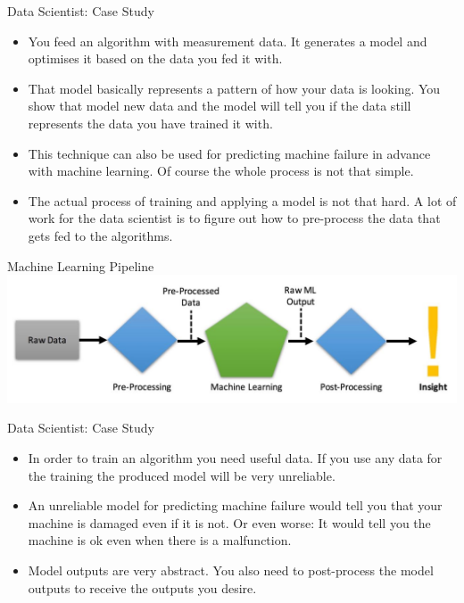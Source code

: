 \documentclass[xcolor=x11names,compress, 24pt]{beamer}
\renewcommand{\(}{\begin{columns}}
\renewcommand{\)}{\end{columns}}
\newcommand{\<}[1]{\begin{column}{#1}}
\renewcommand{\>}{\end{column}}
\begin{document}
\begin{frame}{Data Scientist: Case Study}
	\begin{itemize}
		\item 	You feed an algorithm with measurement data. It generates a model and optimises it based on the data you fed it with. 
		
		\item That model basically represents a pattern of how your data is looking. You show that model new data and the model will tell you if the data still represents the data you have trained it with. 
		
		\item This technique can also be used for predicting machine failure in advance with machine learning. Of course the whole process is not that simple.
		
		\item 	The actual process of training and applying a model is not that hard. A lot of work for the data scientist is to figure out how to pre-process the data that gets fed to the algorithms.
		 
	\end{itemize}
\end{frame}

\begin{frame}{Machine Learning Pipeline}
	\includegraphics[scale=.25]{Machine-Learning-Pipeline}
\end{frame}

\begin{frame}{Data Scientist: Case Study}
	\begin{itemize}
	 
		
		\item 	In order to train an algorithm you need useful data. If you use any data for the training the produced model will be very unreliable.
		
		\item 	An unreliable model for predicting machine failure would tell you that your machine is damaged even if it is not. Or even worse: It would tell you the machine is ok even when there is a malfunction.
		
		\item 	Model outputs are very abstract. You also need to post-process the model outputs to receive the outputs you desire.
	\end{itemize}
\end{frame}
\end{document}
